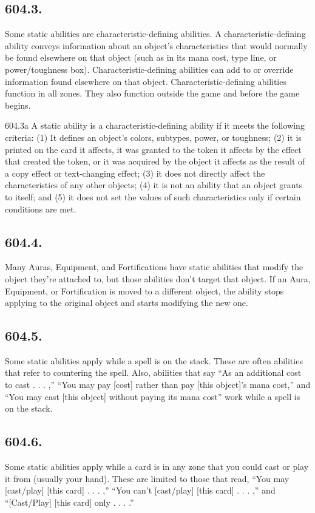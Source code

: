 \subsection*{604.3.}
Some static abilities are characteristic-defining abilities. A characteristic-defining ability conveys information about an object’s characteristics that would normally be found elsewhere on that object (such as in its mana cost, type line, or power/toughness box). Characteristic-defining abilities can add to or override information found elsewhere on that object. Characteristic-defining abilities function in all zones. They also function outside the game and before the game begins.

604.3a A static ability is a characteristic-defining ability if it meets the following criteria: (1) It defines an object’s colors, subtypes, power, or toughness; (2) it is printed on the card it affects, it was granted to the token it affects by the effect that created the token, or it was acquired by the object it affects as the result of a copy effect or text-changing effect; (3) it does not directly affect the characteristics of any other objects; (4) it is not an ability that an object grants to itself; and (5) it does not set the values of such characteristics only if certain conditions are met.

\subsection*{604.4.}
Many Auras, Equipment, and Fortifications have static abilities that modify the object they’re attached to, but those abilities don’t target that object. If an Aura, Equipment, or Fortification is moved to a different object, the ability stops applying to the original object and starts modifying the new one.

\subsection*{604.5.}
Some static abilities apply while a spell is on the stack. These are often abilities that refer to countering the spell. Also, abilities that say “As an additional cost to cast . . . ,” “You may pay [cost] rather than pay [this object]’s mana cost,” and “You may cast [this object] without paying its mana cost” work while a spell is on the stack.

\subsection*{604.6.}
Some static abilities apply while a card is in any zone that you could cast or play it from (usually your hand). These are limited to those that read, “You may [cast/play] [this card] . . . ,” “You can’t [cast/play] [this card] . . . ,” and “[Cast/Play] [this card] only . . . .”

